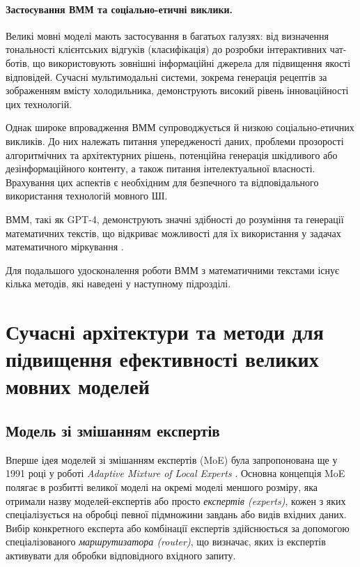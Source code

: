 \paragraph{Застосування ВММ та соціально-етичні виклики.}

Великі мовні моделі мають застосування в багатьох галузях: від визначення тональності клієнтських відгуків (класифікація) до розробки інтерактивних чат-ботів, що використовують зовнішні інформаційні джерела для підвищення якості відповідей. Сучасні мультимодальні системи, зокрема генерація рецептів за зображенням вмісту холодильника, демонструють високий рівень інноваційності цих технологій.

Однак широке впровадження ВММ супроводжується й низкою соціально-етичних викликів. До них належать питання упередженості даних, проблеми прозорості алгоритмічних та архітектурних рішень, потенційна генерація шкідливого або дезінформаційного контенту, а також питання інтелектуальної власності. Врахування цих аспектів є необхідним для безпечного та відповідального використання технологій мовного ШІ.

ВММ, такі як GPT-4, демонструють значні здібності до розуміння та генерації математичних текстів, що відкриває можливості для їх використання у задачах математичного міркування \cite{openai2024gpt4technicalreport}.

Для подальшого удосконалення роботи ВММ з математичними текстами існує кілька методів, які наведені у наступному підрозділі.

\section{Сучасні архітектури та методи для підвищення ефективності великих мовних моделей}

\subsection{Модель зі змішанням експертів}

Вперше ідея моделей зі змішанням експертів (MoE) була запропонована ще у 1991 році у роботі \textit{Adaptive Mixture of Local Experts} \cite{6797059}. Основна концепція MoE полягає в розбитті великої моделі на окремі моделі меншого розміру, яка отримали назву моделей-експертів або просто \emph{експертів (experts)}, кожен з яких спеціалізується на обробці певної підмножини завдань або видів вхідних даних. Вибір конкретного експерта або комбінації експертів здійснюється за допомогою спеціалізованого \emph{маршрутизатора (router)}, що визначає, яких із експертів активувати для обробки відповідного вхідного запиту.

